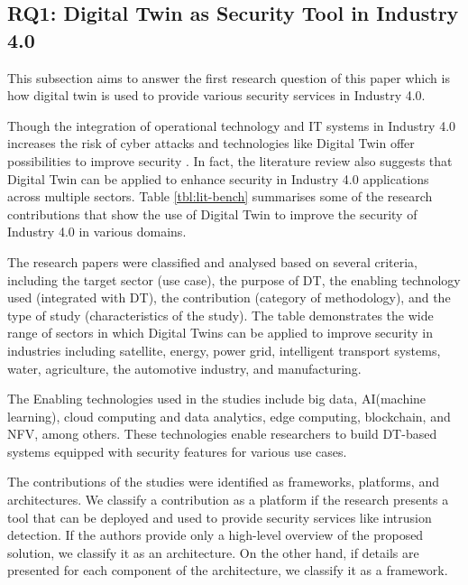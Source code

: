 %
%
\subsection{RQ1: { Digital Twin as Security Tool in Industry 4.0}}
\label{sec:rq1dtsec}
This subsection aims to answer the first research question of this paper which is how digital twin is used to provide various security services in Industry 4.0. 

Though the integration of operational technology and IT systems in Industry 4.0 increases the risk of cyber attacks \cite{rajivfaleiroDigitalTwinCybersecurity2022} and technologies like Digital Twin offer possibilities to improve security \cite{dietzHarnessingDigitalTwin2022}. In fact, the literature review also suggests that Digital Twin can be applied to enhance security in Industry 4.0 applications across multiple sectors. Table \ref{tbl:lit-bench} summarises some of the research contributions that show the use of Digital Twin to improve the security of Industry 4.0 in various domains. 

The research papers were classified and analysed based on several criteria, including the target sector (use case), the purpose of DT, the enabling technology used (integrated with DT), the contribution (category of methodology), and the type of study (characteristics of the study). The table demonstrates the wide range of sectors in which Digital Twins can be applied to improve security in industries including satellite, energy, power grid, intelligent transport systems, water, agriculture, the automotive industry, and manufacturing.

The Enabling technologies used in the studies include big data,  AI(machine learning), cloud computing and data analytics, edge computing, blockchain, and NFV, among others. These technologies enable researchers to build DT-based systems equipped with security features for various use cases.

The contributions of the studies were identified as frameworks, platforms, and architectures. We classify a contribution as a platform if the research presents a tool that can be deployed and used to provide security services like intrusion detection. If the authors provide only a high-level overview of the proposed solution, we classify it as an architecture. On the other hand, if details are presented for each component of the architecture, we classify it as a framework.

